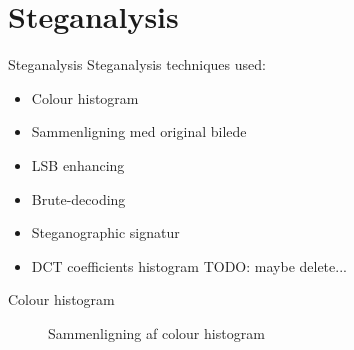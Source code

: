 \section{Steganalysis}
\begin{frame}{Steganalysis}{}
	Steganalysis techniques used:
	\begin{itemize}
		\item Colour histogram
		\item Sammenligning med original bilede
		\item LSB enhancing
		\item Brute-decoding
		\item Steganographic signatur
		\item DCT coefficients histogram TODO: maybe delete...
	\end{itemize}
\end{frame}

\begin{frame}{Colour histogram}{}
\begin{figure}
\centering     %
{}
\end{figure}
\begin{figure}
\centering
{}
\caption{Sammenligning af colour histogram}
\end{figure}
\end{frame}

